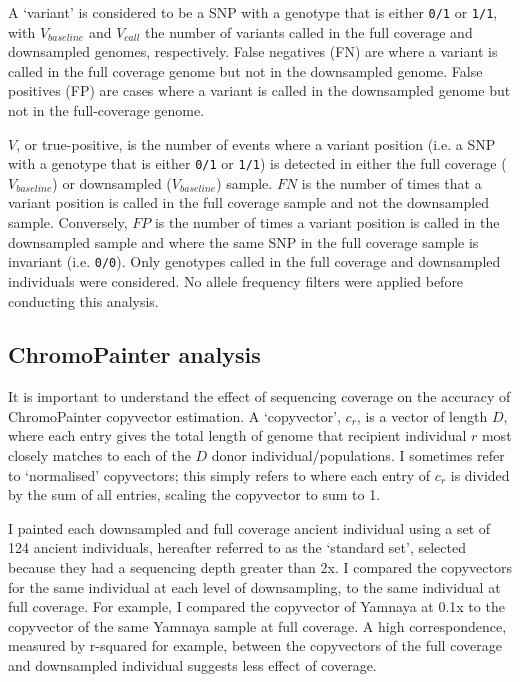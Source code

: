 {A `variant' is considered to be a SNP with a genotype that is either \texttt{0/1} or \texttt{1/1}, with $V_{baseline}$ and $V_{call}$ the number of variants called in the full coverage and downsampled genomes, respectively. False negatives (FN) are where a variant is called in the full coverage genome but not in the downsampled genome. False positives (FP) are cases where a variant is called in the downsampled genome but not in the full-coverage genome.

$V$, or true-positive, is the number of events where a variant position (i.e. a SNP with a genotype that is either \texttt{0/1} or \texttt{1/1}) is detected in either the full coverage ($V_{baseline}$) or downsampled ($V_{baseline}$) sample. $FN$ is the number of times that a variant position is called in the full coverage sample and not the downsampled sample. Conversely, $FP$ is the number of times a variant position is called in the downsampled sample and where the same SNP in the full coverage sample is invariant (i.e. \texttt{0/0}). Only genotypes called in the full coverage and downsampled individuals were considered. No allele frequency filters were applied before conducting this analysis.


\subsection{ChromoPainter analysis} \label{ChromoPainter_analysis}

It is important to understand the effect of sequencing coverage on the accuracy of ChromoPainter copyvector estimation. A `copyvector', $c_{r}$, is a vector of length $D$, where each entry gives the total length of genome that recipient individual $r$ most closely matches to each of the $D$ donor individual/populations. I sometimes refer to `normalised' copyvectors; this simply refers to where each entry of $c_r$ is divided by the sum of all entries, scaling the copyvector to sum to 1. 

I painted each downsampled and full coverage ancient individual using a set of 124 ancient individuals, hereafter referred to as the `standard set', selected because they had a sequencing depth greater than 2x. I compared the copyvectors for the same individual at each level of downsampling, to the same individual at full coverage. For example, I compared the copyvector of Yamnaya at 0.1x to the copyvector of the same Yamnaya sample at full coverage. A high correspondence, measured by r-squared for example, between the copyvectors of the full coverage and downsampled individual suggests less effect of coverage. 

}
